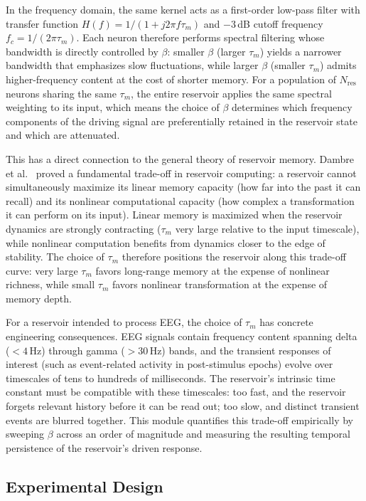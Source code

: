 In the frequency domain, the same kernel acts as a first-order low-pass filter with transfer function $H(f) = 1/(1 + j2\pi f \tau_m)$ and $-3$\,dB cutoff frequency $f_c = 1/(2\pi\tau_m)$. Each neuron therefore performs spectral filtering whose bandwidth is directly controlled by $\beta$: smaller $\beta$ (larger $\tau_m$) yields a narrower bandwidth that emphasizes slow fluctuations, while larger $\beta$ (smaller $\tau_m$) admits higher-frequency content at the cost of shorter memory. For a population of $N_{\text{res}}$ neurons sharing the same $\tau_m$, the entire reservoir applies the same spectral weighting to its input, which means the choice of $\beta$ determines which frequency components of the driving signal are preferentially retained in the reservoir state and which are attenuated.

This has a direct connection to the general theory of reservoir memory. Dambre et al.\ \cite{dambre_2012} proved a fundamental trade-off in reservoir computing: a reservoir cannot simultaneously maximize its linear memory capacity (how far into the past it can recall) and its nonlinear computational capacity (how complex a transformation it can perform on its input). Linear memory is maximized when the reservoir dynamics are strongly contracting ($\tau_m$ very large relative to the input timescale), while nonlinear computation benefits from dynamics closer to the edge of stability. The choice of $\tau_m$ therefore positions the reservoir along this trade-off curve: very large $\tau_m$ favors long-range memory at the expense of nonlinear richness, while small $\tau_m$ favors nonlinear transformation at the expense of memory depth.

For a reservoir intended to process EEG, the choice of $\tau_m$ has concrete engineering consequences. EEG signals contain frequency content spanning delta ($<4$\,Hz) through gamma ($>30$\,Hz) bands, and the transient responses of interest (such as event-related activity in post-stimulus epochs) evolve over timescales of tens to hundreds of milliseconds. The reservoir's intrinsic time constant must be compatible with these timescales: too fast, and the reservoir forgets relevant history before it can be read out; too slow, and distinct transient events are blurred together. This module quantifies this trade-off empirically by sweeping $\beta$ across an order of magnitude and measuring the resulting temporal persistence of the reservoir's driven response.

\subsection{Experimental Design}

